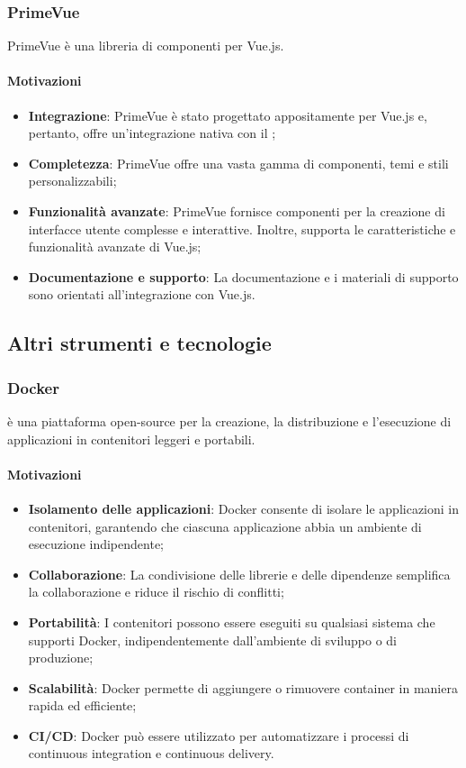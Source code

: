 \subsubsection{PrimeVue}\label{sec:primevue}
\par PrimeVue è una libreria di componenti per Vue.js.
\paragraph*{Motivazioni}
\begin{itemize}
  \item \textbf{Integrazione}: PrimeVue è stato progettato appositamente per Vue.js e, pertanto, offre un'integrazione nativa con il ;
  \item \textbf{Completezza}: PrimeVue offre una vasta gamma di componenti, temi e stili personalizzabili;
  \item \textbf{Funzionalità avanzate}: PrimeVue fornisce componenti per la creazione di interfacce utente complesse e interattive. Inoltre, supporta le caratteristiche e funzionalità avanzate di Vue.js;
  \item \textbf{Documentazione e supporto}: La documentazione e i materiali di supporto sono orientati all'integrazione con Vue.js.
\end{itemize}

\subsection{Altri strumenti e tecnologie}\label{sec:tecnologie-generali}

\subsubsection{Docker}\label{sec:docker}
\par {} è una piattaforma open-source per la creazione, la distribuzione e l'esecuzione di applicazioni in contenitori leggeri e portabili.
\paragraph*{Motivazioni}
\begin{itemize}
  \item \textbf{Isolamento delle applicazioni}: Docker consente di isolare le applicazioni in contenitori, garantendo che ciascuna applicazione abbia un ambiente di esecuzione indipendente;
  \item \textbf{Collaborazione}: La condivisione delle librerie e delle dipendenze semplifica la collaborazione e riduce il rischio di conflitti;
  \item \textbf{Portabilità}: I contenitori possono essere eseguiti su qualsiasi sistema che supporti Docker, indipendentemente dall'ambiente di sviluppo o di produzione;
  \item \textbf{Scalabilità}: Docker permette di aggiungere o rimuovere container in maniera rapida ed efficiente;
  \item \textbf{CI/CD}: Docker può essere utilizzato per automatizzare i processi di continuous integration e continuous delivery.
\end{itemize}

